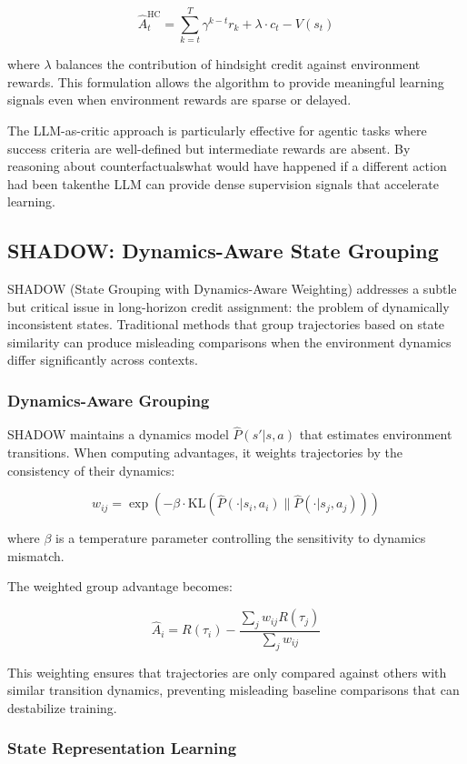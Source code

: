 $$\hat{A}_t^{\text{HC}} = \sum_{k=t}^{T} \gamma^{k-t} r_k + \lambda \cdot c_t - V(s_t)$$

where $\lambda$ balances the contribution of hindsight credit against environment rewards. This formulation allows the algorithm to provide meaningful learning signals even when environment rewards are sparse or delayed.

The LLM-as-critic approach is particularly effective for agentic tasks where success criteria are well-defined but intermediate rewards are absent. By reasoning about counterfactualswhat would have happened if a different action had been takenthe LLM can provide dense supervision signals that accelerate learning.

\subsection{SHADOW: Dynamics-Aware State Grouping}

SHADOW (State Grouping with Dynamics-Aware Weighting) addresses a subtle but critical issue in long-horizon credit assignment: the problem of dynamically inconsistent states. Traditional methods that group trajectories based on state similarity can produce misleading comparisons when the environment dynamics differ significantly across contexts.

\subsubsection{Dynamics-Aware Grouping}

SHADOW maintains a dynamics model $\hat{P}(s'|s,a)$ that estimates environment transitions. When computing advantages, it weights trajectories by the consistency of their dynamics:

$$w_{ij} = \exp\left(-\beta \cdot \text{KL}\left(\hat{P}(\cdot|s_i, a_i) \| \hat{P}(\cdot|s_j, a_j)\right)\right)$$

where $\beta$ is a temperature parameter controlling the sensitivity to dynamics mismatch.

The weighted group advantage becomes:

$$\hat{A}_i = R(\tau_i) - \frac{\sum_{j} w_{ij} R(\tau_j)}{\sum_{j} w_{ij}}$$

This weighting ensures that trajectories are only compared against others with similar transition dynamics, preventing misleading baseline comparisons that can destabilize training.

\subsubsection{State Representation Learning}

